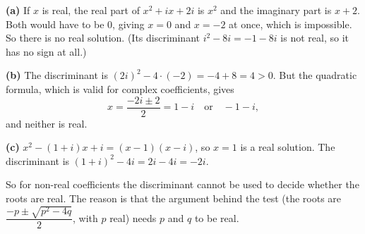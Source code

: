 \textbf{(a)} If $x$ is real, the real part of $x^2+ix+2i$ is $x^2$ and the imaginary part is $x+2$. Both would have to be $0$, giving $x=0$ and $x=-2$ at once, which is impossible. So there is no real solution. (Its discriminant $i^2-8i=-1-8i$ is not real, so it has no sign at all.)

\textbf{(b)} The discriminant is $(2i)^2-4\cdot(-2)=-4+8=4>0$. But the quadratic formula, which is valid for complex coefficients, gives
\[x=\dfrac{-2i\pm2}{2}=1-i\quad\text{or}\quad-1-i,\]
and neither is real.

\textbf{(c)} $x^2-(1+i)x+i=(x-1)(x-i)$, so $x=1$ is a real solution. The discriminant is $(1+i)^2-4i=2i-4i=-2i$.

So for non-real coefficients the discriminant cannot be used to decide whether the roots are real. The reason is that the argument behind the test (the roots are $\dfrac{-p\pm\sqrt{p^2-4q}}2$, with $p$ real) needs $p$ and $q$ to be real.
